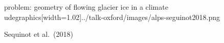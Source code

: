 \documentclass[svgnames,
               hyperref={colorlinks,citecolor=DeepPink4,linkcolor=FireBrick,urlcolor=Maroon},
               usepdftitle=false]  %
               {beamer}
\begin{document}
\begin{frame}{problem: geometry of flowing glacier ice in a climate}
udegraphics[width=1.02\textwidth]{../talk-oxford/images/alps-seguinot2018.png}

\vspace{-2mm}
\hfill {\tiny Sequinot et al.~(2018)}
\end{frame}
\end{document}
